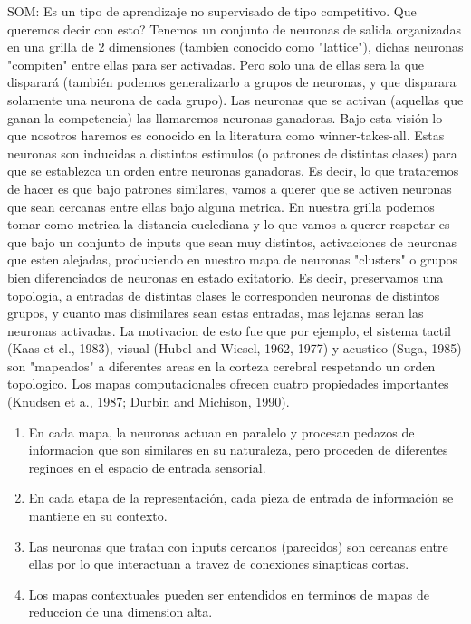 SOM:
Es un tipo de aprendizaje no supervisado de tipo competitivo. Que queremos decir con esto? Tenemos un conjunto de neuronas de salida organizadas en una grilla de 2 dimensiones (tambien conocido como "lattice"), dichas neuronas "compiten" entre ellas para ser activadas. Pero solo una de ellas sera la que disparará (también podemos generalizarlo a grupos de neuronas, y que disparara solamente una neurona de cada grupo). Las neuronas que se activan (aquellas que ganan la competencia) las llamaremos neuronas ganadoras. Bajo esta visión lo que nosotros haremos es conocido en la literatura como winner-takes-all. Estas neuronas son inducidas a distintos estimulos (o patrones de distintas clases) para que se establezca un orden entre neuronas ganadoras. Es decir, lo que trataremos de hacer es que bajo patrones similares, vamos a querer que se activen neuronas que sean cercanas entre ellas bajo alguna metrica. En nuestra grilla podemos tomar como metrica la distancia euclediana y lo que vamos a querer respetar es que bajo un conjunto de inputs que sean muy distintos, activaciones de neuronas que esten alejadas, produciendo en nuestro mapa de neuronas "clusters" o grupos bien diferenciados de neuronas en estado exitatorio. Es decir, preservamos una topologia, a entradas de distintas clases le corresponden neuronas de distintos grupos, y cuanto mas disimilares sean estas entradas, mas lejanas seran las neuronas activadas. La motivacion de esto fue que por ejemplo, el sistema tactil (Kaas et cl., 1983), visual (Hubel and Wiesel, 1962, 1977) y acustico (Suga, 1985) son "mapeados" a diferentes areas en la corteza cerebral respetando un orden topologico.
Los mapas computacionales ofrecen cuatro propiedades importantes (Knudsen et a., 1987; Durbin and Michison, 1990).
\begin{enumerate}
\item En cada mapa, la neuronas actuan en paralelo y procesan pedazos de informacion que son similares en su naturaleza, pero proceden de diferentes reginoes en el espacio de entrada sensorial.
\item En cada etapa de la representación, cada pieza de entrada de información se mantiene en su contexto.
\item Las neuronas que tratan con inputs cercanos (parecidos) son cercanas entre ellas por lo que interactuan a travez de conexiones sinapticas cortas.
\item Los mapas contextuales pueden ser entendidos en terminos de mapas de reduccion de una dimension alta.
\end{enumerate}

